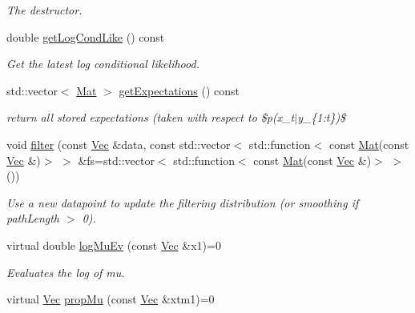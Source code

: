 \begin{DoxyCompactItemize}
\begin{DoxyCompactList}\small\item\em The destructor. \end{DoxyCompactList}\item 
double \hyperlink{classAPFFilter_ac2142078c81d660421ad2d98b80aee38}{get\+Log\+Cond\+Like} () const 
\begin{DoxyCompactList}\small\item\em Get the latest log conditional likelihood. \end{DoxyCompactList}\item 
std\+::vector$<$ \hyperlink{apf__filter_8h_ae601f56a556993079f730483c574356f}{Mat} $>$ \hyperlink{classAPFFilter_a103b23fb56c293eaa63e4312b050952f}{get\+Expectations} () const 
\begin{DoxyCompactList}\small\item\em return all stored expectations (taken with respect to \$p(x\+\_\+t$\vert$y\+\_\+\{1\+:t\})\$ \end{DoxyCompactList}\item 
void \hyperlink{classAPFFilter_a0ce3e3d31a90ff06f6e62b66755f239b}{filter} (const \hyperlink{apf__filter_8h_a4c7df05c6f5e8a0d15ae14bcdbc07152}{Vec} \&data, const std\+::vector$<$ std\+::function$<$ const \hyperlink{apf__filter_8h_ae601f56a556993079f730483c574356f}{Mat}(const \hyperlink{apf__filter_8h_a4c7df05c6f5e8a0d15ae14bcdbc07152}{Vec} \&)$>$ $>$ \&fs=std\+::vector$<$ std\+::function$<$ const \hyperlink{apf__filter_8h_ae601f56a556993079f730483c574356f}{Mat}(const \hyperlink{apf__filter_8h_a4c7df05c6f5e8a0d15ae14bcdbc07152}{Vec} \&)$>$ $>$())
\begin{DoxyCompactList}\small\item\em Use a new datapoint to update the filtering distribution (or smoothing if path\+Length $>$ 0). \end{DoxyCompactList}\item 
virtual double \hyperlink{classAPFFilter_a5a046e084b1eb982f743c180cc0b7c9f}{log\+Mu\+Ev} (const \hyperlink{apf__filter_8h_a4c7df05c6f5e8a0d15ae14bcdbc07152}{Vec} \&x1)=0
\begin{DoxyCompactList}\small\item\em Evaluates the log of mu. \end{DoxyCompactList}\item 
virtual \hyperlink{apf__filter_8h_a4c7df05c6f5e8a0d15ae14bcdbc07152}{Vec} \hyperlink{classAPFFilter_a7fe96c18e0e3206210295c12de883c39}{prop\+Mu} (const \hyperlink{apf__filter_8h_a4c7df05c6f5e8a0d15ae14bcdbc07152}{Vec} \&xtm1)=0

\end{DoxyCompactItemize}
